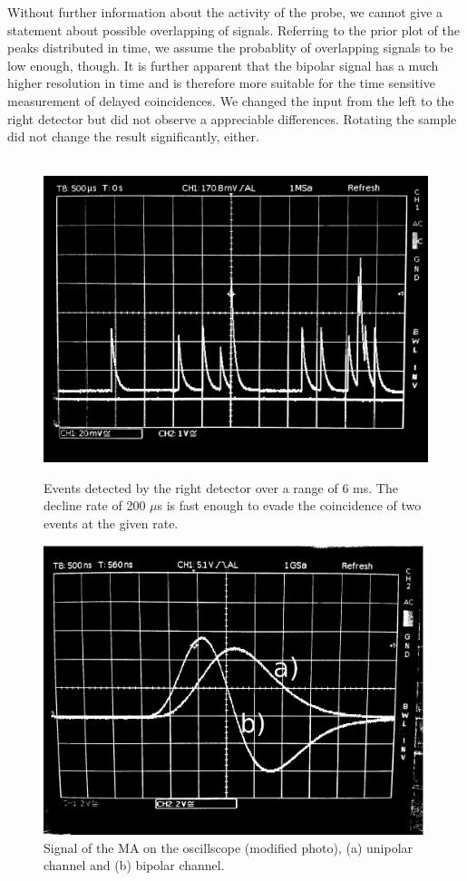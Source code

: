 Without further information about the activity of the probe, we cannot give a statement about 
possible overlapping of signals. Referring to the prior plot of the peaks distributed in time, we 
assume the probablity of overlapping signals to be low enough, though. 
It is further apparent that the bipolar signal has a much higher resolution in time and is therefore 
more suitable for the time sensitive measurement of delayed coincidences. 
We changed the input from the left to the right detector but did not observe a appreciable differences.
Rotating the sample did not change the result significantly, either.  
\\\\
\begin{figure}
    \begin{centering}
        \caption{
            Events detected by the right detector over a range of 6 ms. 
            The decline rate of 200 $\mu$s is fast enough to evade the 
            coincidence of two events at the given rate. 
            }
        \includegraphics[width=0.45\linewidth]{figures/osci_signal}
        \label{fig:osci_signal}
    \end{centering}
\end{figure}

\begin{figure}[htpb]
    \centering
    \includegraphics[width=0.8\linewidth]{figures/uni_bipolar2}
    \caption{Signal of the MA on the oscillscope (modified photo), 
        (a) unipolar channel and (b) bipolar channel.}
    \label{fig:uni_bipolar}
\end{figure}

